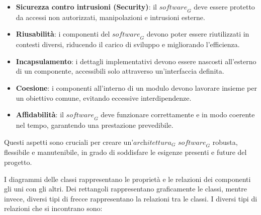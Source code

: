 \begin{itemize}
\item \textbf{Sicurezza contro intrusioni (Security)}: il $\textit{software}_G$ deve essere protetto da accessi non autorizzati, manipolazioni e intrusioni esterne.
\item \textbf{Riusabilità}: i componenti del $\textit{software}_G$ devono poter essere riutilizzati in contesti diversi, riducendo il carico di sviluppo e migliorando l'efficienza.
\item \textbf{Incapsulamento}: i dettagli implementativi devono essere nascosti all'esterno di un componente, accessibili solo attraverso un'interfaccia definita.
\item \textbf{Coesione}: i componenti all'interno di un modulo devono lavorare insieme per un obiettivo comune, evitando eccessive interdipendenze.
\item \textbf{Affidabilità}: il $\textit{software}_G$ deve funzionare correttamente e in modo coerente nel tempo, garantendo una prestazione prevedibile.
\end{itemize}
Questi aspetti sono cruciali per creare un'$\textit{architettura}_G$ $\textit{software}_G$ robusta, flessibile e manutenibile, in grado di soddisfare le esigenze presenti e future del progetto.

I diagrammi delle classi rappresentano le proprietà e le relazioni dei componenti gli uni con gli altri.
Dei rettangoli rappresentano graficamente le classi, mentre invece, diversi tipi di frecce rappresentano la relazioni tra le classi.
I diversi tipi di relazioni che si incontrano sono:

